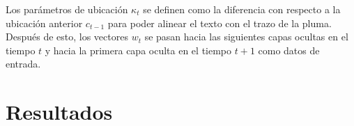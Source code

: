 Los parámetros de ubicación $\kappa_t$ se definen como la diferencia con respecto a la ubicación anterior $c_{t-1}$ para poder alinear el texto con el trazo de la pluma. Después de esto, los vectores $w_t$ se pasan hacia las siguientes capas ocultas en el tiempo $t$ y hacia la primera capa oculta en el tiempo $t+1$ como datos de entrada.


\section{Resultados}


\vspace{1em}





